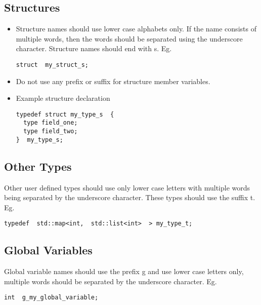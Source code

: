\subsection{Structures}

\begin{itemize}

  \item Structure names should use lower case alphabets only. If the
name consists of multiple words, then the words should be separated
using the underscore character. Structure names should end with s. Eg.

\begin{Verbatim}
struct  my_struct_s;
\end{Verbatim}

  \item Do not use any prefix or suffix for structure member
  variables.

  \item Example structure declaration

\begin{Verbatim}
typedef struct my_type_s  {
  type field_one;
  type field_two;
}  my_type_s;
\end{Verbatim}

\end{itemize}





\subsection{Other Types}

Other user defined types should use only lower case letters with
multiple words being separated by the underscore character. These
types should use the suffix t.  Eg.

\begin{Verbatim}
typedef  std::map<int,  std::list<int>  > my_type_t;
\end{Verbatim}


\subsection{Global Variables}

Global variable names should use the prefix g and use lower case
letters only, multiple words should be separated by the underscore
character.  Eg.

\begin{Verbatim}
int  g_my_global_variable;
\end{Verbatim}


